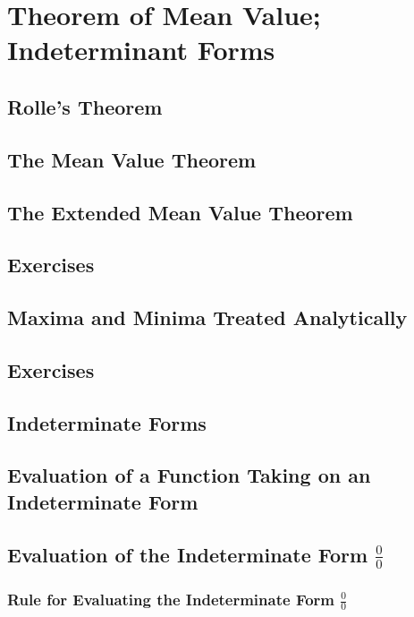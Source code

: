\chapter{Theorem of Mean Value; Indeterminant Forms}
\label{ch:13}

\section{Rolle's Theorem}
\label{sec:13:01}

\section{The Mean Value Theorem}
\label{sec:13:02}

\section{The Extended Mean Value Theorem}
\label{sec:13:03}

\section{Exercises}
\label{sec:13:04}

\section{Maxima and Minima Treated Analytically}
\label{sec:13:05}

\section{Exercises}
\label{sec:13:06}

\section{Indeterminate Forms}
\label{sec:13:07}

\section{Evaluation of a Function Taking on an Indeterminate Form}
\label{sec:13:08}

\section{Evaluation of the Indeterminate Form $\frac{0}{0}$}
\label{sec:13:09}

\subsection{Rule for Evaluating the Indeterminate Form $\frac{0}{0}$}
\label{subsec:13:09:01}

